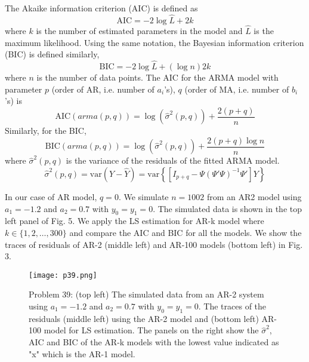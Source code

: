 \documentclass[a4paper, 11pt]{article}
\begin{document}
The Akaike information criterion (AIC) is defined as 
\begin{equation}
\text{AIC} = -2\log{\hat{L}} + 2k
\end{equation}
where $k$ is the number of estimated parameters in the model and $\hat{L}$ is the maximum likelihood. Using the same notation, the Bayesian information criterion (BIC) is defined similarly, 
\begin{equation}
\text{BIC} = -2\log{\hat{L}} + (\log{n})2k
\end{equation}
where $n$ is the number of data points. The AIC for the ARMA model with parameter $p$ (order of AR, i.e. number of $a_i$'s), $q$ (order of MA, i.e. number of $b_i$'s) is 
\begin{equation}
\text{AIC}(arma(p,q)) = \log{(\hat{\sigma}^2(p,q))} + \frac{2(p+q)}{n}
\end{equation}
Similarly, for the BIC, 
\begin{equation}
\text{BIC}(arma(p,q)) = \log{(\hat{\sigma}^2(p,q))} + \frac{2(p+q)\log{n}}{n}
\end{equation}
where $\hat{\sigma}^2(p,q)$ is the variance of the residuals of the fitted ARMA model.
\begin{equation}
\hat{\sigma}^2(p,q) = \text{var}(Y - \hat{Y}) = \text{var}\left\{ \left[ I_{p+q} - \Psi (\Psi ' \Psi)^{-1} \Psi ' \right]Y \right\}
\end{equation}

In our case of AR model, $q = 0$. We simulate $n = 1002$ from an AR2 model using $a_1 = -1.2$ and $a_2=0.7$ with $y_0 = y_1 = 0$. The simulated data is shown in the top left panel of Fig. 5. We apply the LS estimation for AR-k model where $k \in \{1,2,\dots, 300 \}$ and compare the AIC and BIC for all the models. We show the traces of residuals of AR-2 (middle left) and AR-100 models (bottom left) in Fig. 3.  

\begin{figure}
	\begin{center}
		\texttt{[image: p39.png]}
		\caption{Problem 39: (top left) The simulated data from an AR-2 system using $a_1 = -1.2$ and $a_2=0.7$ with $y_0 = y_1 = 0$. The traces of the residuals (middle left) using the AR-2 model and (bottom left) AR-100 model for LS estimation. The panels on the right show the $\hat{\sigma}^2$, AIC and BIC of the AR-k models with the lowest value indicated as "x" which is the AR-1 model. }
	\end{center}
\end{figure}
\end{document}
